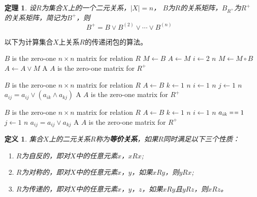 \documentclass{book}[oneside]
\newtheorem{Def}{定义}[chapter]
\newtheorem{Thm}{定理}[chapter]
\begin{document}
\begin{CJK*}{UTF8}{gbsn}
    \begin{Thm}
    设$R$为集合$X$上的一个二元关系，$|X| = n$， $B$为$R$的关系矩阵，$B_{R^+}$为$R^+$的关系矩阵，简记为$B^+$，则
    \begin{equation*}
      B^+ = B \lor B^{(2)} \lor \cdots \lor B^{(n)}
    \end{equation*}
  \end{Thm}

  以下为计算集合$X$上关系$R$的传递闭包的算法。
   \begin{codebox}
    \zi \Comment $B$ is the zero-one $n \times n$ matrix for relation $R$
    \li $M \gets B$
    \li $A \gets M$
    \li \For $i \gets 2$ \To $n$
    \li \Do
        $M \gets M \circ B$
    \li $A \gets A \lor M$
    \End
    \li \Return A \Comment $A$ is the zero-one matrix for $R^+$
  \end{codebox}
  \begin{codebox}
    \zi \Comment $B$ is the zero-one $n \times n$ matrix for relation $R$
    \li $A \gets B$
    \li \For $k \gets 1$ \To $n$
    \li \Do
    \For $i \gets 1$ \To $n$
    \li \Do
    \For $j \gets 1$ \To $n$
    \li \Do
    $a_{ij} = a_{ij} \lor (a_{ik} \land a_{kj})$
    \End
    \End
    \End
    \li \Return A \Comment $A$ is the zero-one matrix for $R^+$
  \end{codebox}  

    \begin{codebox}
    \zi \Comment $B$ is the zero-one $n \times n$ matrix for relation $R$
    \li $A \gets B$
    \li \For $k \gets 1$ \To $n$
    \li \Do
    \For $i \gets 1$ \To $n$
    \li \Do
     \If $a_{ik} \isequal 1$
    \li \Then
    \For $j \gets 1$ \To $n$
    \li \Do
    $a_{ij} = a_{ij} \lor a_{kj}$
    \End
    \End
    \End
    \End
    \li \Return A \Comment $A$ is the zero-one matrix for $R^+$
  \end{codebox}
  \begin{Def}
    集合$X$上的二元关系$R$称为{\bfseries 等价关系}，如果$R$同时满足以下三个性质：
    \begin{enumerate}
    \item $R$为自反的，即对$X$中的任意元素$x$，$xRx$;
    \item $R$为对称的，即对$X$中的任意元素$x$，$y$，如果$xRy$，则$yRx$;
    \item $R$为传递的，即对$X$中的任意元素$x$，$y$，$z$，如果$xRy$且$yRz$，则$xRz$。
    \end{enumerate}
  \end{Def}


\end{CJK*}
\end{document}
